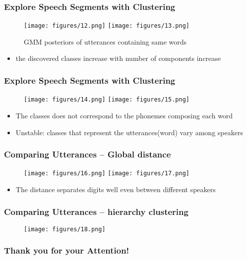 \documentclass[t]{beamer}
\begin{document}
\begin{frame}
	\frametitle{Explore Speech Segments with Clustering}
	\begin{figure}
		\centering
		\texttt{[image: figures/12.png]}
		\texttt{[image: figures/13.png]}
		\caption{GMM posteriors of utterances containing same words}
	\end{figure}
\begin{itemize}
\item the discovered classes increase with number of components increase

\end{itemize}

\end{frame}

\begin{frame}
	\frametitle{Explore Speech Segments with Clustering}
	\begin{figure}
\centering
		\texttt{[image: figures/14.png]}
		\texttt{[image: figures/15.png]}
	\end{figure}
	\begin{itemize}
		\item The classes does not correspond to the phonemes composing each word
		\item Unstable: classes that represent the utterances(word) vary among speakers
	\end{itemize}
\end{frame}


\begin{frame}
	\frametitle{Comparing Utterances -- Global distance}
	\begin{figure}
		\texttt{[image: figures/16.png]}
		\texttt{[image: figures/17.png]}
	\end{figure}
	\begin{itemize}
		\item The distance separates digits well even between different speakers
	\end{itemize}

\end{frame}
\begin{frame}
	\frametitle{Comparing Utterances -- hierarchy clustering}
	\begin{figure}
		\texttt{[image: figures/18.png]}
	\end{figure}
\end{frame}

\begin{frame}
	\frametitle{Thank you for your Attention!}	
\end{frame}
	
\end{document}
